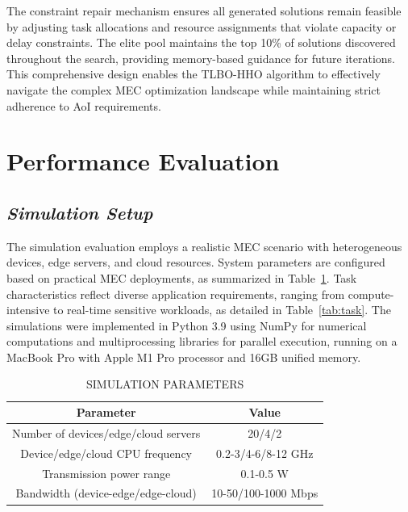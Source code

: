 \documentclass[conference]{IEEEtran}
\begin{document}
The constraint repair mechanism ensures all generated solutions remain feasible by adjusting task allocations and resource assignments that violate capacity or delay constraints. The elite pool maintains the top 10\% of solutions discovered throughout the search, providing memory-based guidance for future iterations. This comprehensive design enables the TLBO-HHO algorithm to effectively navigate the complex MEC optimization landscape while maintaining strict adherence to AoI requirements.

\section{Performance Evaluation}
\subsection{\textit{Simulation Setup}}
The simulation evaluation employs a realistic MEC scenario with heterogeneous devices, edge servers, and cloud resources. System parameters are configured based on practical MEC deployments, as summarized in Table~\ref{tab:system}. Task characteristics reflect diverse application requirements, ranging from compute-intensive to real-time sensitive workloads, as detailed in Table~\ref{tab:task}. The simulations were implemented in Python 3.9 using NumPy for numerical computations and multiprocessing libraries for parallel execution, running on a MacBook Pro with Apple M1 Pro processor and 16GB unified memory.

\begin{table}[!t]
\small
\centering
\caption{SIMULATION PARAMETERS}
\label{tab:system}
\begin{tabular}{|c|c|}
\hline
\textbf{Parameter} & \textbf{Value} \\
\hline
Number of devices/edge/cloud servers & 20/4/2 \\
Device/edge/cloud CPU frequency & 0.2-3/4-6/8-12 GHz \\
Transmission power range & 0.1-0.5 W \\
Bandwidth (device-edge/edge-cloud) & 10-50/100-1000 Mbps \\
\hline
\end{tabular}
\end{table}
\end{document}
